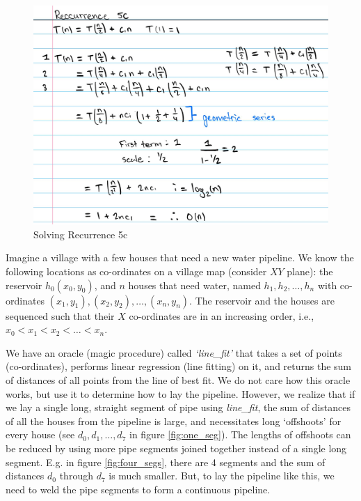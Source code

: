 \documentclass[addpoints]{exam}
\def\mysolution#1{}    %
\begin{document}
\begin{questions}
\begin{parts}
\begin{figure}[H]
  \centering
  \includegraphics[width=0.7\linewidth]{5c.jpg}
  \caption{Solving Recurrence 5c}
\end{figure}

\mysolution{

}

\end{parts}


Imagine a village with a few houses that need a new water pipeline. We know the following locations as co-ordinates on a village map (consider $XY$ plane): the reservoir $h_0 (x_0,y_0)$, and $n$ houses that need water, named $h_1, h_2, \dots, h_n$ with co-ordinates $(x_1, y_1), (x_2, y_2), \dots, (x_n, y_n)$. The reservoir and the houses are sequenced such that their $X$ co-ordinates are in an increasing order, i.e., $x_0 < x_1< x_2 < \dots < x_n$.

We have an oracle (magic procedure) called \textit{`line\_fit'} that takes a set of points (co-ordinates), performs linear regression (line fitting) on it, and returns the sum of distances of all points from the line of best fit. We do not care how this oracle works, but use it to determine how to lay the pipeline. However, we realize that if we lay a single long, straight segment of pipe using \textit{line\_fit}, the sum of distances of all the houses from the pipeline is large, and necessitates long `offshoots' for every house (see $d_0, d_1, \dots, d_7$ in figure \ref{fig:one_seg}). The lengths of offshoots can be reduced by using more pipe segments joined together instead of a single long segment. E.g. in figure \ref{fig:four_segs}, there are 4 segments and the sum of distances $d_0$ through $d_7$ is much smaller. But, to lay the pipeline like this, we need to weld the pipe segments to form a continuous pipeline.


\end{questions}
\end{document}

